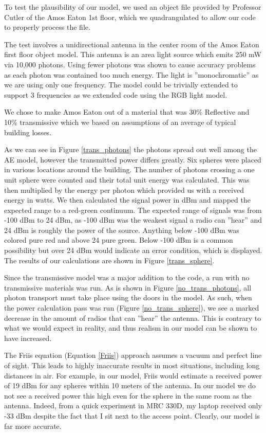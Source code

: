 \documentclass[%
        final,
        notitlepage,
        narroweqnarray,
        inline,
        twoside,
        ]{ieee}
\begin{document}
To test the plausibility of our model, we used an object file provided by Professor Cutler
of the Amos Eaton 1st floor, which we quadrangulated to allow our code to properly process
the file.

The test involves a unidirectional antenna in the center room of the Amos Eaton
first floor object model. This antenna is an area light source which emits 250 mW via 
10,000 photons. Using fewer photons was shown to cause accuracy problems as each
photon was contained too much energy. The light is ''monochromatic'' as we are 
using only one frequency. The model could be trivially extended to support 3 
frequencies as we extended code using the RGB light model.

We chose to make Amos Eaton out of a material that was 30\% Reflective and 10\%
transmissive which we based on assumptions of an average of typical building losses.

As we can see in Figure \ref{trans_photons} the photons spread out well among the AE model, however
the transmitted power differs greatly. Six spheres were placed in various locations around
the building. The number of photons crossing a one unit sphere were counted and their total 
unit energy was calculated. This was then multiplied by the energy per photon which provided
us with a received energy in watts. We then calculated the signal power in dBm and mapped the
expected range to a red-green continuum. The expected range of signals was from -100 dBm to 24 dBm,
as -100 dBm was the weakest signal a radio can ''hear'' and 24 dBm is roughly the power of the source.
Anything below -100 dBm was colored pure red and above 24 pure green. Below -100 dBm is a common 
possibility but over 24 dBm would indicate an error condition, which is displayed. The results of our
calculations are shown in Figure \ref{trans_sphere}.

Since the transmissive model was a major addition to the code, a run with no transmissive materials was
run. As is shown in Figure \ref{no_trans_photons}, all photon transport must take place using the doors
in the model. As such, when the power calculation pass was run (Figure \ref{no_trans_sphere}), we see a marked decrease in the amount of radios that can ''hear'' the antenna. This is contrary to what we would expect in reality, and thus
realism in our model can be shown to have increased.
  
The Friis equation (Equation \ref{Friis}) approach assumes a vacuum and perfect line of sight.
This leads to highly inaccurate results in most situations, including long
distances in air. For example, in our model, Friis would estimate a received power of 19 dBm 
for any spheres within 10 meters of the antenna. In our model we do not see a received power 
this high even for the sphere in the same room as the antenna. Indeed, from a quick experiment in
MRC 330D, my laptop received only -33 dBm despite the fact that I sit next to the access point.
Clearly, our model is far more accurate.  
\end{document}
